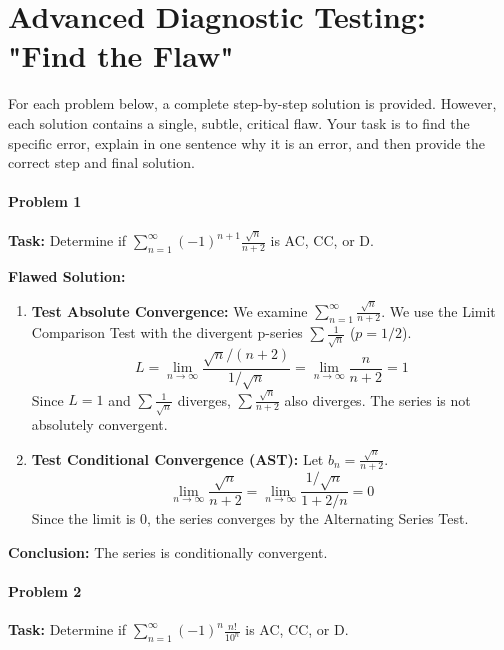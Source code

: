 \documentclass{article}
\begin{document}
\part{Advanced Diagnostic Testing: "Find the Flaw"}

For each problem below, a complete step-by-step solution is provided. However, each solution contains a single, subtle, critical flaw. Your task is to find the specific error, explain in one sentence why it is an error, and then provide the correct step and final solution.

\subsection*{Problem 1}
\textbf{Task:} Determine if $\sum_{n=1}^{\infty} (-1)^{n+1} \frac{\sqrt{n}}{n+2}$ is AC, CC, or D.

\textbf{Flawed Solution:}
\begin{enumerate}
    \item \textbf{Test Absolute Convergence:} We examine $\sum_{n=1}^{\infty} \frac{\sqrt{n}}{n+2}$. We use the Limit Comparison Test with the divergent p-series $\sum \frac{1}{\sqrt{n}}$ ($p=1/2$).
    \[ L = \lim_{n \to \infty} \frac{\sqrt{n}/(n+2)}{1/\sqrt{n}} = \lim_{n \to \infty} \frac{n}{n+2} = 1 \]
    Since $L=1$ and $\sum \frac{1}{\sqrt{n}}$ diverges, $\sum \frac{\sqrt{n}}{n+2}$ also diverges. The series is not absolutely convergent.
    \item \textbf{Test Conditional Convergence (AST):} Let $b_n = \frac{\sqrt{n}}{n+2}$.
    \[ \lim_{n \to \infty} \frac{\sqrt{n}}{n+2} = \lim_{n \to \infty} \frac{1/\sqrt{n}}{1+2/n} = 0 \]
    Since the limit is 0, the series converges by the Alternating Series Test.
\end{enumerate}
\textbf{Conclusion:} The series is conditionally convergent.

\subsection*{Problem 2}
\textbf{Task:} Determine if $\sum_{n=1}^{\infty} (-1)^n \frac{n!}{10^n}$ is AC, CC, or D.
\end{document}
